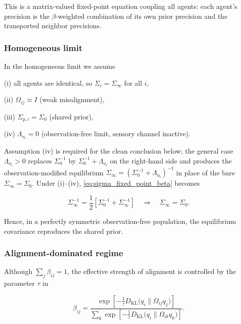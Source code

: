 \documentclass[11pt]{article}
\begin{document}
This is a matrix-valued fixed-point equation coupling all agents: each agent's precision is the $\beta$-weighted combination of its own prior precision and the transported neighbor precisions.

\subsubsection{Homogeneous limit}

In the homogeneous limit we assume

(i) all agents are identical, so $\Sigma_i = \Sigma_\infty$ for all $i$,

(ii) $\Omega_{ij} \approx I$ (weak misalignment),

(iii) $\Sigma_{p,i} = \Sigma_0$ (shared prior),

(iv) $\Lambda_{o_i} = 0$ (observation-free limit, sensory channel inactive).

Assumption (iv) is required for the clean conclusion below; the general case $\Lambda_{o_i} > 0$ replaces $\Sigma_0^{-1}$ by $\Sigma_0^{-1} + \Lambda_{o_i}$ on the right-hand side and produces the observation-modified equilibrium $\Sigma_\infty = (\Sigma_0^{-1} + \Lambda_{o_i})^{-1}$ in place of the bare $\Sigma_\infty = \Sigma_0$. Under (i)--(iv), \eqref{eq:sigma_fixed_point_beta} becomes

\begin{equation}
\Sigma_\infty^{-1}
=\frac{1}{2}
\left[
\Sigma_0^{-1}
+ \Sigma_\infty^{-1}
\right]
\quad\Longrightarrow\quad
\Sigma_\infty = \Sigma_0.
\end{equation}

Hence, in a perfectly symmetric observation-free population, the equilibrium covariance reproduces the shared prior.

\subsubsection{Alignment-dominated regime}

Although $\sum_j \beta_{ij} = 1$, the effective strength of alignment is controlled by the parameter $\tau$ in

\begin{equation}
\beta_{ij}
=\frac{
\exp\left[
-\frac{1}{\tau}
D_{\mathrm{KL}}\big(q_i \| \Omega_{ij} q_j\big)
\right]
}{\sum_k
\exp\left[
-\frac{1}{\tau}
D_{\mathrm{KL}}\big(q_i \| \Omega_{ik} q_k\big)
\right]}.
\end{equation}
\end{document}
